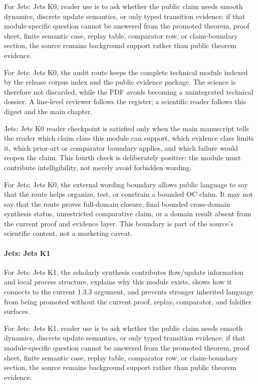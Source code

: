 For Jets: Jets K0, reader use is to ask whether the public claim needs smooth dynamics, discrete update semantics, or only typed transition evidence; if that module-specific question cannot be answered from the promoted theorem, proof sheet, finite semantic case, replay table, comparator row, or claim-boundary section, the source remains background support rather than public theorem evidence.


For Jets: Jets K0, the audit route keeps the complete technical module indexed by the release corpus index and the public evidence package. The science is therefore not discarded, while the PDF avoids becoming a unintegrated technical dossier. A line-level reviewer follows the register; a scientific reader follows this digest and the main chapter.


Jets: Jets K0 reader checkpoint is satisfied only when the main manuscript tells the reader which claim class this module can support, which evidence class limits it, which prior-art or comparator boundary applies, and which failure would reopen the claim. This fourth check is deliberately positive: the module must contribute intelligibility, not merely avoid forbidden wording.


For Jets: Jets K0, the external wording boundary allows public language to say that the route helps organize, test, or constrain a bounded OC claim. It may not say that the route proves full-domain closure, final bounded cross-domain synthesis status, unrestricted comparative claim, or a domain result absent from the current proof and evidence layer. This boundary is part of the source's scientific content, not a marketing caveat.


\paragraph{Jets: Jets K1}

For Jets: Jets K1, the scholarly synthesis contributes flow/update information and local process structure, explains why this module exists, shows how it connects to the current 1.3.3 argument, and prevents stronger inherited language from being promoted without the current proof, replay, comparator, and falsifier surfaces.


For Jets: Jets K1, reader use is to ask whether the public claim needs smooth dynamics, discrete update semantics, or only typed transition evidence; if that module-specific question cannot be answered from the promoted theorem, proof sheet, finite semantic case, replay table, comparator row, or claim-boundary section, the source remains background support rather than public theorem evidence.


